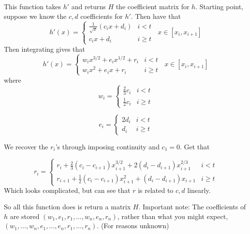 This function takes $h'$ and returns $H$ the coefficient matrix for $h$.
Starting point, suppose we know the $c,d$ coefficients for $h'$.
Then have that 
$$ h'(x) = \left\{ \begin{array}{cc} \frac{1}{\sqrt{x}}(c_ix+d_i) &
i <t \\ c_ix+d_i & i \geq t \end{array} \right. \;\; x \in [x_i,x_{i+1}] $$
Then integrating gives that 
$$ h'(x) = \left\{ \begin{array}{cc} w_ix^{3/2}+e_ix^{1/2}+r_i &
i <t \\ w_ix^2+e_i x + r_i & i \geq t \end{array} \right. \;\; x 
\in [x_i,x_{i+1}] $$
where
$$ w_i = \left\{ \begin{array}{cc} \frac{2}{3} c_i &
i <t \\[4pt] \frac{1}{2}c_i & i \geq t \end{array} \right.  $$

$$ e_i = \left\{ \begin{array}{cc} 2d_i &
i <t \\[4pt] d_i & i \geq t \end{array} \right.  $$

We recover the $r_i$'s through imposing continuity and $c_1=0$. Get
that

$$ r_i = \left\{ \begin{array}{cc} r_i + \frac{2}{3}(c_i-c_{i+1})x^{3/2}_{i+1}
+2(d_i-d_{i+1})x^{2/3}_{i+1} & i <t \\[4pt] 
r_{i+1} + \frac{1}{2}(c_i-c_{i+1})x^2_{i+1} +(d_i-d_{i+1})x_{i+1} & 
i \geq t \end{array} \right.  $$
Which looks complicated, but can see that $r$ is related to $c,d$ linearly. 

So all this function does is return a matrix $H$.
Important note: The coefficients of $h$ are stored
$(w_1,e_1,r_1, \dots, w_n,e_n,r_n)$, rather than what you might expect, 
$(w_1,\dots, w_n, e_1, \dots, e_n, r_1, \dots, r_n)$. (For reasons unknown)
